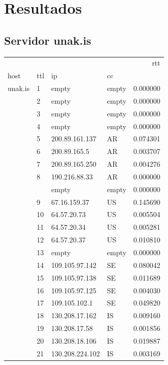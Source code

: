 \section{Resultados}
\subsection{Servidor unak.is}

\begin{center}
\begin{tabular}{llllr}
\toprule
        &    &               &    &       rtt \\
host & ttl & ip & cc &           \\
\midrule
unak.is & 1  & empty & empty &  0.000000 \\
        & 2  & empty & empty &  0.000000 \\
        & 3  & empty & empty &  0.000000 \\
        & 4  & empty & empty &  0.000000 \\
        & 5  & 200.89.161.137 & AR &  0.074301 \\
        & 6  & 200.89.165.5 &  AR &  0.003707 \\
        & 7  & 200.89.165.250 & AR &  0.004276 \\
        & 8  & 190.216.88.33 & AR &  0.000000 \\
        &    & empty & empty &  0.000000 \\
        & 9  & 67.16.159.37 & US &  0.145690 \\
        & 10 & 64.57.20.73 & US &  0.005504 \\
        & 11 & 64.57.20.34 & US &  0.005281 \\
        & 12 & 64.57.20.37 & US &  0.010810 \\
        & 13 & empty & empty &  0.000000 \\
        & 14 & 109.105.97.142 & SE &  0.080042 \\
        & 15 & 109.105.97.138 & SE &  0.011689 \\
        & 16 & 109.105.97.125 & SE &  0.004030 \\
        & 17 & 109.105.102.1 & SE &  0.049820 \\
        & 18 & 130.208.17.162 & IS &  0.009160 \\
        & 19 & 130.208.17.58 & IS &  0.001856 \\
        & 20 & 130.208.18.106 & IS &  0.019887 \\
        & 21 & 130.208.224.102 & IS &  0.003169 \\
\bottomrule
\end{tabular}
\end{center}

